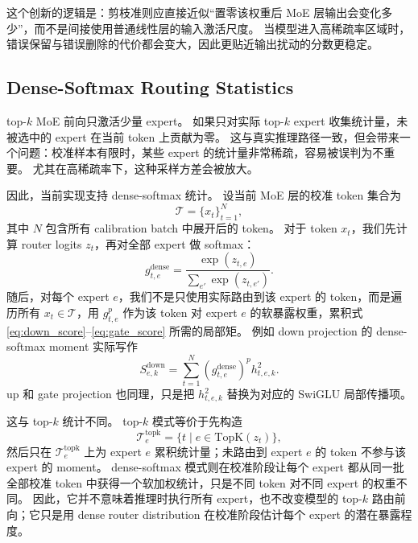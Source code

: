 \documentclass[letterpaper]{article}
\begin{document}
这个创新的逻辑是：剪枝准则应直接近似“置零该权重后 MoE 层输出会变化多少”，而不是间接使用普通线性层的输入激活尺度。
当模型进入高稀疏率区域时，错误保留与错误删除的代价都会变大，因此更贴近输出扰动的分数更稳定。

\subsection{Dense-Softmax Routing Statistics}

top-$k$ MoE 前向只激活少量 expert。
如果只对实际 top-$k$ expert 收集统计量，未被选中的 expert 在当前 token 上贡献为零。
这与真实推理路径一致，但会带来一个问题：校准样本有限时，某些 expert 的统计量非常稀疏，容易被误判为不重要。
尤其在高稀疏率下，这种采样方差会被放大。

因此，当前实现支持 dense-softmax 统计。
设当前 MoE 层的校准 token 集合为
\begin{equation}
    \mathcal{T}=\{x_t\}_{t=1}^{N},
\end{equation}
其中 $N$ 包含所有 calibration batch 中展开后的 token。
对于 token $x_t$，我们先计算 router logits $z_t$，再对全部 expert 做 softmax：
\begin{equation}
    g_{t,e}^{\mathrm{dense}}
    =
    \frac{\exp(z_{t,e})}
    {\sum_{e'}\exp(z_{t,e'})}.
\end{equation}
随后，对每个 expert $e$，我们不是只使用实际路由到该 expert 的 token，而是遍历所有 $x_t\in\mathcal{T}$，用 $g_{t,e}^{p}$ 作为该 token 对 expert $e$ 的软暴露权重，累积式 \eqref{eq:down_score}--\eqref{eq:gate_score} 所需的局部矩。
例如 down projection 的 dense-softmax moment 实际写作
\begin{equation}
    S^{\mathrm{down}}_{e,k}
    =
    \sum_{t=1}^{N}
    \left(g_{t,e}^{\mathrm{dense}}\right)^p
    h_{t,e,k}^{2}.
\end{equation}
up 和 gate projection 也同理，只是把 $h_{t,e,k}^{2}$ 替换为对应的 SwiGLU 局部传播项。

这与 top-$k$ 统计不同。
top-$k$ 模式等价于先构造
\begin{equation}
    \mathcal{T}^{\mathrm{topk}}_e
    =
    \{t\mid e \in \mathrm{TopK}(z_t)\},
\end{equation}
然后只在 $\mathcal{T}^{\mathrm{topk}}_e$ 上为 expert $e$ 累积统计量；未路由到 expert $e$ 的 token 不参与该 expert 的 moment。
dense-softmax 模式则在校准阶段让每个 expert 都从同一批全部校准 token 中获得一个软加权统计，只是不同 token 对不同 expert 的权重不同。
因此，它并不意味着推理时执行所有 expert，也不改变模型的 top-$k$ 路由前向；它只是用 dense router distribution 在校准阶段估计每个 expert 的潜在暴露程度。
\end{document}
